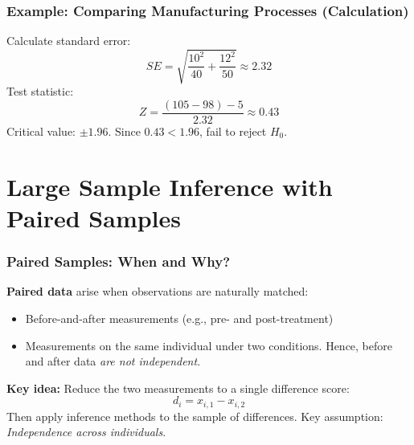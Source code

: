 \documentclass[handout]{beamer}
\begin{document}
\begin{frame}
\frametitle{Example: Comparing Manufacturing Processes (Calculation)}
Calculate standard error:
\[
SE = \sqrt{\frac{10^2}{40} + \frac{12^2}{50}} \approx 2.32
\]
Test statistic:
\[
Z = \frac{(105-98) - 5}{2.32} \approx 0.43
\]
Critical value: $\pm1.96$. \newline
Since $0.43 < 1.96$, fail to reject $H_0$.
\end{frame}

\section{Large Sample Inference with Paired Samples}



\begin{frame}
\frametitle{Paired Samples: When and Why?}
\textbf{Paired data} arise when observations are naturally matched:
\begin{itemize}
    \item Before-and-after measurements (e.g., pre- and post-treatment)
    \item Measurements on the same individual under two conditions. Hence, before and after data \emph{are not independent}.
\end{itemize}
\textbf{Key idea:} Reduce the two measurements to a single difference score:
\[ d_i = x_{i,1} - x_{i,2} \]
Then apply inference methods to the sample of differences. Key assumption: \emph{Independence across individuals}.
\end{frame}
\end{document}
